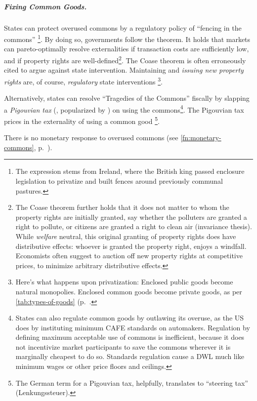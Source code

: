 \subparagraph{Fixing Common Goods.}  \label{sec:common-good-response} 
States can protect overused commons by a regulatory policy of ``fencing in the commons''
\footnote{
	The expression stems from Ireland, where the British king passed enclosure legislation to privatize and built fences around previously communal pastures. %
}. 
By doing so, governments follow the \cite{Coase1960} theorem. 
It holds that markets can pareto-optimally resolve externalities if transaction costs are sufficiently low, and if property rights are well-defined\footnote{
	The Coase theorem further holds that it does not matter to whom the property rights are initially granted, say whether the polluters are granted a right to pollute, or citizens are granted a right to clean air (invariance thesis). 
	While \emph{welfare} neutral, this original granting of property rights does have distributive effects: whoever is granted the property right, enjoys a windfall. 
	Economists often suggest to auction off new property rights at competitive prices, to minimize arbitrary distributive effects.%
}.
The Coase theorem is often erroneously cited to argue against state intervention. 
Maintaining and \emph{issuing new property rights} are, of course, \emph{regulatory} state interventions
\footnote{
	Here's what happens upon privatization: Enclosed public goods become natural monopolies. 
	Enclosed common goods become private goods, as per \autoref{tab:types-of-goods} (p.~\pageref{tab:types-of-goods}.
}.

Alternatively, states can resolve ``Tragedies of the Commons'' \citep{Hardin-1968-aa} fiscally by slapping a \emph{Pigouvian tax} (\citealt{Pigou1912}, popularized by \citealt{Baumol1972}) on using the commons\footnote{
	States can also regulate common goods by outlawing its overuse, as the US does by instituting minimum \gls{CAFE} standards on automakers. 
	Regulation by defining maximum acceptable use of commons is inefficient, because it does not incentivize market participants to save the commons wherever it is marginally cheapest to do so.
	 Standards regulation cause a \gls{DWL} much like minimum wages or other price floors and ceilings.
}. 
The Pigouvian tax prices in the externality of using a common good
\footnote{
	The German term for a Pigouvian tax, helpfully, translates to ``steering tax'' (Lenkungssteuer).
}. 

There is no monetary response to overused commons (see \autoref{fn:monetary-commons}, p.~\pageref{fn:monetary-commons}).

